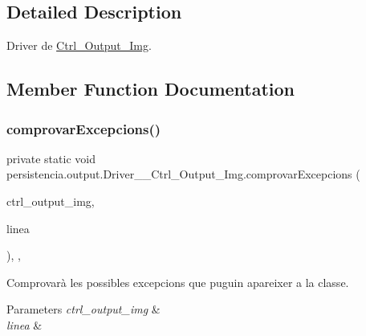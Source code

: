 \subsection{Detailed Description}
Driver de \hyperlink{classpersistencia_1_1output_1_1Ctrl__Output__Img}{Ctrl\+\_\+\+Output\+\_\+\+Img}. 

\subsection{Member Function Documentation}
\mbox{\label{classpersistencia_1_1output_1_1Driver____Ctrl__Output__Img_ab6af9c875a2582dbb7e466be9bb6bbbb}} 
\subsubsection{\texorpdfstring{comprovar\+Excepcions()}{comprovarExcepcions()}}
{\footnotesize\ttfamily private static void persistencia.\+output.\+Driver\+\_\+\+\_\+\+Ctrl\+\_\+\+Output\+\_\+\+Img.\+comprovar\+Excepcions (\begin{DoxyParamCaption}\item[{\hyperlink{classpersistencia_1_1output_1_1Ctrl__Output__Img}{Ctrl\+\_\+\+Output\+\_\+\+Img}}]{ctrl\+\_\+output\+\_\+img,  }\item[{String}]{linea }\end{DoxyParamCaption})\hspace{0.3cm}{\ttfamily [inline]}, {\ttfamily [static]}, {\ttfamily [private]}}



Comprovarà les possibles excepcions que puguin apareixer a la classe. 


\begin{DoxyParams}{Parameters}
{\em ctrl\+\_\+output\+\_\+img} & \\
\hline
{\em linea} & \\
\hline
\end{DoxyParams}


